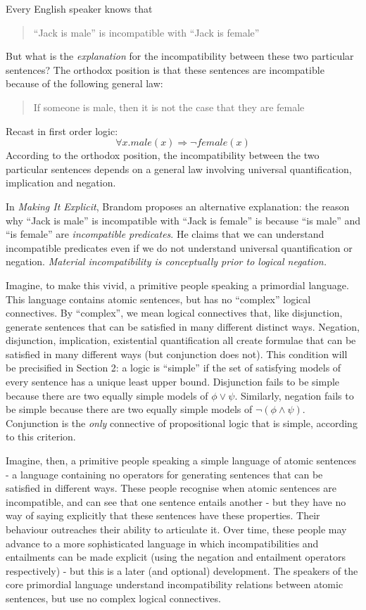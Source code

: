 Every English speaker knows that
\begin{quote}
``Jack is male'' is incompatible with ``Jack is female''
\end{quote}
But what is the \emph{explanation} for the incompatibility between these two particular sentences? 
The orthodox position is that these sentences are incompatible because of the following general law:
\begin{quote}
If someone is male, then it is not the case that they are female
\end{quote}
Recast in first order logic:
\[
\forall x. male(x) \Rightarrow \neg female(x)
\]
According to the orthodox position, the incompatibility between the two particular sentences depends on a general law involving universal quantification, implication and negation. 

In \emph{Making It Explicit}\cite{brandom2}, Brandom proposes an alternative explanation:
the reason why ``Jack is male'' is incompatible with ``Jack is female'' is because ``is male'' and ``is female'' are \emph{incompatible predicates}.
He claims that we can understand incompatible predicates even if we do not understand universal quantification or negation.  \emph{Material incompatibility is
conceptually prior to logical negation.}

Imagine, to make this vivid, a primitive people speaking a
primordial language.  This language contains atomic sentences, but has
no ``complex'' logical connectives.  By ``complex'', we mean logical
connectives that, like disjunction, generate sentences that can be
satisfied in many different distinct ways.  Negation, disjunction,
implication, existential quantification all create formulae that can
be satisfied in many different ways (but conjunction does not). This condition will be
precisified in Section 2: a logic is ``simple'' if the set of
satisfying models of every sentence has a unique least upper
bound. Disjunction fails to be simple because there are two equally
simple models of $\phi \lor \psi$. Similarly, negation fails to be simple
because there are two equally simple models of $\neg (\phi \land
\psi)$. Conjunction is the \emph{only} connective of propositional logic that is simple,
according to this criterion.

Imagine, then, a primitive people speaking a simple language of
atomic sentences - a language containing no operators for generating
sentences that can be satisfied in different ways.  These people
recognise when atomic sentences are incompatible, and can see that one
sentence entails another - but they have no way of saying explicitly
that these sentences have these properties.  Their behaviour
outreaches their ability to articulate it.  Over time, these people
may advance to a more sophisticated language in which
incompatibilities and entailments can be made explicit (using the
negation and entailment operators respectively) - but this is a later
(and optional) development. The speakers of the core primordial
language understand incompatibility relations between atomic
sentences, but use no complex logical connectives.

